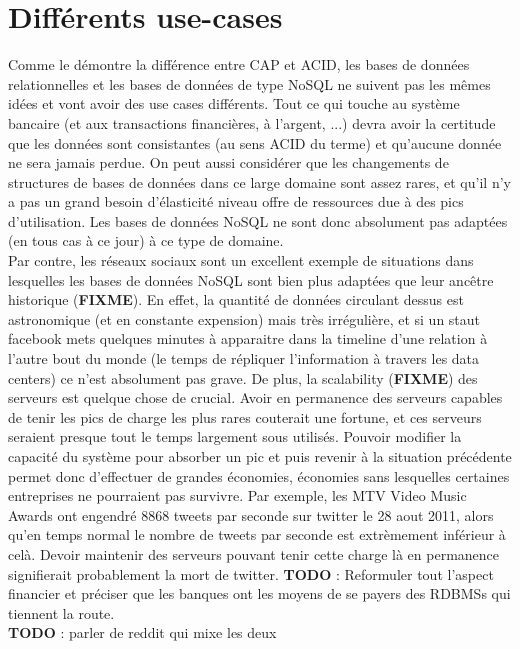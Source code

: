 \documentclass[11pt]{article}
\begin{document}
\section{Différents use-cases}
Comme le démontre la différence entre CAP et ACID, les bases de données relationnelles et les bases de données de type NoSQL ne suivent pas les mêmes idées et vont avoir des use cases différents. Tout ce qui touche au système bancaire (et aux transactions financières, à l'argent, ...) devra avoir la certitude que les données sont consistantes (au sens ACID du terme) et qu'aucune donnée ne sera jamais perdue. On peut aussi considérer que les changements de structures de bases de données dans ce large domaine sont assez rares, et qu'il n'y a pas un grand besoin d'élasticité niveau offre de ressources due à des pics d'utilisation. Les bases de données NoSQL ne sont donc absolument pas adaptées (en tous cas à ce jour) à ce type de domaine. \\
Par contre, les réseaux sociaux sont un excellent exemple de situations dans lesquelles les bases de données NoSQL sont bien plus adaptées que leur ancêtre historique (\colorbox{BrickRed}{\textbf{FIXME}}). En effet, la quantité de données circulant dessus est astronomique (et en constante expension) mais très irrégulière, et si un staut facebook mets quelques minutes à apparaitre dans la timeline d'une relation à l'autre bout du monde (le temps de répliquer l'information à travers les data centers) ce n'est absolument pas grave. De plus, la scalability (\colorbox{BrickRed}{\textbf{FIXME}}) des serveurs est quelque chose de crucial. Avoir en permanence des serveurs capables de tenir les pics de charge les plus rares couterait une fortune, et ces serveurs seraient presque tout le temps largement sous utilisés. Pouvoir modifier la capacité du système pour absorber un pic et puis revenir à la situation précédente permet donc d'effectuer de grandes économies, économies sans lesquelles certaines entreprises ne pourraient pas survivre. Par exemple, les MTV Video Music Awards ont engendré 8868 tweets par seconde sur twitter le 28 aout 2011, alors qu'en temps normal le nombre de tweets par seconde est extrèmement inférieur à celà. Devoir maintenir des serveurs pouvant tenir cette charge là en permanence signifierait probablement la mort de twitter. \colorbox{BrickRed}{\textbf{TODO} : Reformuler tout l'aspect financier et préciser que les banques ont les}  \colorbox{BrickRed}{moyens de se payers des RDBMSs qui tiennent la route.} \\
\colorbox{BrickRed}{\textbf{TODO} : parler de reddit qui mixe les deux}
\end{document}
